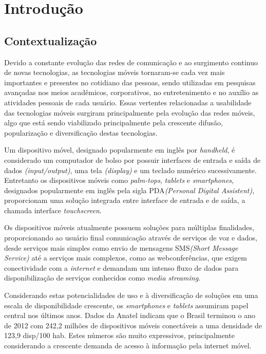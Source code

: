 \chapter{Introdução} %
\label{cha:chapter_name}

\section{Contextualização} %
\label{sec:contextualizacao}
Devido a constante evolução das redes de comunicação e ao surgimento continuo de
novas tecnologias, as tecnologias móveis tornaram-se cada vez mais importantes e
presentes no cotidiano das pessoas, sendo utilizadas em pesquisas avançadas nos
meios acadêmicos, corporativos, no entretenimento e no auxílio as atividades
pessoais de cada usuário. Essas vertentes relacionadas a usabilidade
das tecnologias móveis surgiram principalmente pela evolução das redes
móveis, algo que está sendo viabilizado principalmente pela crescente difusão,
popularização e diversificação destas tecnologias.

Um dispositivo móvel, designado popularmente em inglês por \textit{handheld}, é
considerado um computador de bolso por possuir interfaces de entrada e saída
de dados \textit{(input/output)}, uma tela \textit{(display)} e um teclado
numérico sucessivamente. Entretanto os dispositivos móveis como
\textit{palm-tops}, \textit{tablets} e \textit{smartphones}, designados
popularmente em inglês pela sigla PDA\textit{(Personal Digital Assistent)},
proporcionam uma solução integrada entre interface de entrada e de saída, a
chamada interface \textit{touchscreen}.

Os dispositivos móveis atualmente possuem soluções para múltiplas finalidades,
proporcionando ao usuário final comunicação através de serviços de voz e dados,
desde serviços mais simples como envio de mensagens SMS\textit{(Short Message
Service)} até a serviços mais complexos, como as webconferências, que exigem
conectividade com a \textit{internet} e demandam um intenso fluxo de dados para
disponibilização de serviços conhecidos como \textit{media streaming}.

Considerando estas potencialidades de uso e à diversificação de soluções em uma
escala de disponibilidade crescente, os \textit{smartphones} e \textit{tablets}
assumiram papel central nos últimos anos. Dados da Anatel indicam que o Brasil
terminou o ano de 2012 com 242,2 milhões de dispositivos móveis conectáveis
a uma densidade de 123,9 disp/100 hab. Estes números são muito expressivos,
principalmente considerando a crescente demanda de acesso à informação pela
internet móvel.
